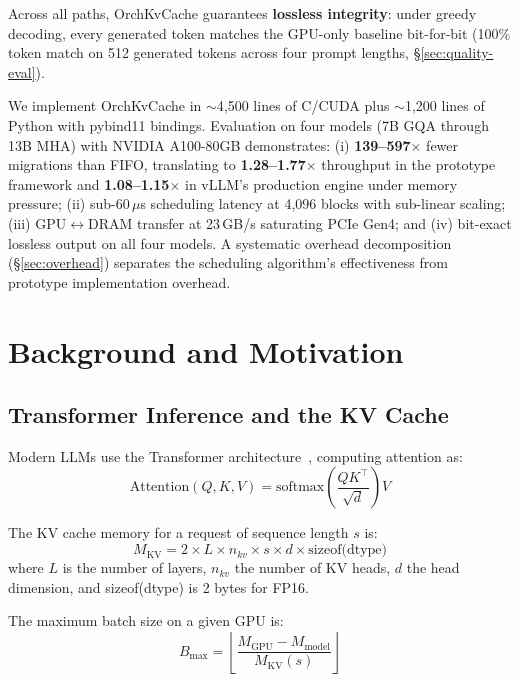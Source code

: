 \documentclass[conference]{IEEEtran}
\begin{document}
Across all paths, OrchKvCache guarantees \textbf{lossless integrity}: under greedy decoding, every generated token matches the GPU-only baseline bit-for-bit (100\% token match on 512 generated tokens across four prompt lengths, \S\ref{sec:quality-eval}).


We implement OrchKvCache in ${\sim}$4,500 lines of C/CUDA plus ${\sim}$1,200 lines of Python with pybind11 bindings. Evaluation on four models (7B GQA through 13B MHA) with NVIDIA A100-80GB demonstrates: (i) \textbf{139--597$\times$} fewer migrations than FIFO, translating to \textbf{1.28--1.77$\times$} throughput in the prototype framework and \textbf{1.08--1.15$\times$} in vLLM's production engine under memory pressure; (ii) sub-60\,$\mu$s scheduling latency at 4,096 blocks with sub-linear scaling; (iii) GPU$\leftrightarrow$DRAM transfer at 23\,GB/s saturating PCIe Gen4; and (iv) bit-exact lossless output on all four models. A systematic overhead decomposition (\S\ref{sec:overhead}) separates the scheduling algorithm's effectiveness from prototype implementation overhead.

\section{Background and Motivation}

\subsection{Transformer Inference and the KV Cache}

Modern LLMs use the Transformer architecture~\cite{transformer}, computing attention as:
\begin{equation}
\text{Attention}(Q, K, V) = \text{softmax}\!\left(\frac{QK^\top}{\sqrt{d}}\right) V
\end{equation}


The KV cache memory for a request of sequence length $s$ is:
\begin{equation}
M_{\text{KV}} = 2 \times L \times n_{kv} \times s \times d \times \text{sizeof(dtype)}
\end{equation}
where $L$ is the number of layers, $n_{kv}$ the number of KV heads, $d$ the head dimension, and sizeof(dtype) is 2 bytes for FP16.

The maximum batch size on a given GPU is:
\begin{equation}
B_{\max} = \left\lfloor \frac{M_{\text{GPU}} - M_{\text{model}}}{M_{\text{KV}}(s)} \right\rfloor
\end{equation}
\end{document}
